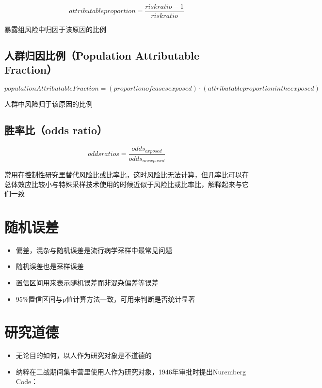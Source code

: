 \documentclass[
]{book}
\providecommand{\tightlist}{%
  \setlength{\itemsep}{0pt}\setlength{\parskip}{0pt}}
\begin{document}
\[attributable proportion = \frac{risk ratio - 1}{risk ratio}\]

暴露组风险中归因于该原因的比例

\hypertarget{ux4ebaux7fa4ux5f52ux56e0ux6bd4ux4f8bpopulation-attributable-fraction}{%
\subsection{人群归因比例（Population Attributable Fraction）}\label{ux4ebaux7fa4ux5f52ux56e0ux6bd4ux4f8bpopulation-attributable-fraction}}

\[population Attributable Fraction = (proportion of cases exposed) \cdot (attributable proportion in the exposed)\]

人群中风险归于该原因的比例

\hypertarget{ux80dcux7387ux6bd4odds-ratio}{%
\subsection{胜率比（odds ratio）}\label{ux80dcux7387ux6bd4odds-ratio}}

\[odds ratios = \frac{odds_{exposed}}{odds_{unexposed}}\]

常用在控制性研究里替代风险比或比率比，这时风险比无法计算，但几率比可以在总体效应比较小与特殊采样技术使用的时候近似于风险比或比率比，解释起来与它们一致

\hypertarget{ux968fux673aux8befux5dee}{%
\section{随机误差}\label{ux968fux673aux8befux5dee}}

\begin{itemize}
\tightlist
\item
  偏差，混杂与随机误差是流行病学采样中最常见问题
\item
  随机误差也是采样误差
\item
  置信区间用来表示随机误差而非混杂偏差等误差
\item
  95\%置信区间与p值计算方法一致，可用来判断是否统计显著
\end{itemize}

\hypertarget{ux7814ux7a76ux9053ux5fb7}{%
\section{研究道德}\label{ux7814ux7a76ux9053ux5fb7}}

\begin{itemize}
\tightlist
\item
  无论目的如何，以人作为研究对象是不道德的
\item
  纳粹在二战期间集中营里使用人作为研究对象，1946年审批时提出Nuremberg Code：
\end{itemize}
\end{document}
